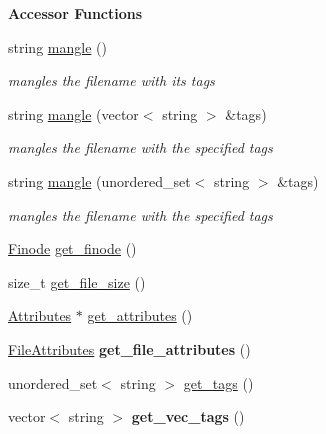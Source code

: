 \begin{Indent}{\bf Accessor Functions}\par
\begin{DoxyCompactItemize}
\item 
string \hyperlink{classFileInfo_a96827c2e48fb1a15d468e9afd545383e}{mangle} ()
\begin{DoxyCompactList}\small\item\em mangles the filename with its tags \end{DoxyCompactList}\item 
string \hyperlink{classFileInfo_a105ad751f21bead6fc2a76e79cb3b701}{mangle} (vector$<$ string $>$ \&tags)
\begin{DoxyCompactList}\small\item\em mangles the filename with the specified tags \end{DoxyCompactList}\item 
string \hyperlink{classFileInfo_aec8a60addbed54097f6cac0a6a516717}{mangle} (unordered\+\_\+set$<$ string $>$ \&tags)
\begin{DoxyCompactList}\small\item\em mangles the filename with the specified tags \end{DoxyCompactList}\item 
\hyperlink{structfinode}{Finode} \hyperlink{classFileInfo_a706117270bcf31739d7ce0aa0d79891f}{get\+\_\+finode} ()
\item 
size\+\_\+t \hyperlink{classFileInfo_aa07a5b95bfd41814b7fb2ee30a279c65}{get\+\_\+file\+\_\+size} ()
\item 
\hyperlink{classAttributes}{Attributes} $\ast$ \hyperlink{classFileInfo_a07f09582ef3c3beb105906d5c71234a5}{get\+\_\+attributes} ()
\item 
\hyperlink{structfile__attributes}{File\+Attributes} {\bfseries get\+\_\+file\+\_\+attributes} ()\hypertarget{classFileInfo_a0acbb8eead54541137757001474fa689}{}\label{classFileInfo_a0acbb8eead54541137757001474fa689}

\item 
unordered\+\_\+set$<$ string $>$ \hyperlink{classFileInfo_a63d01334c1c2ae22e5d1930afa5c74d4}{get\+\_\+tags} ()
\item 
vector$<$ string $>$ {\bfseries get\+\_\+vec\+\_\+tags} ()\hypertarget{classFileInfo_ad66648be9d256ac110cdcf204a3eacc7}{}\label{classFileInfo_ad66648be9d256ac110cdcf204a3eacc7}

\end{DoxyCompactItemize}
\end{Indent}
